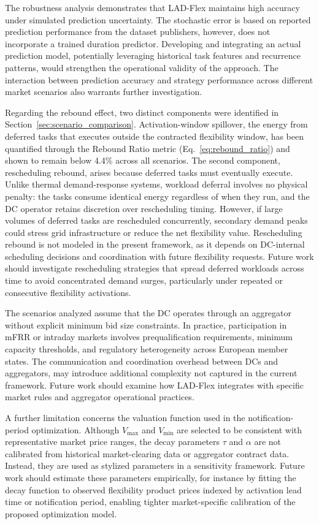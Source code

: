 \documentclass[preprint,12pt]{elsarticle}
\begin{document}
The robustness analysis demonstrates that LAD-Flex maintains high accuracy under simulated prediction uncertainty. The stochastic error is based on reported prediction performance from the dataset publishers, however, does not incorporate a trained duration predictor. Developing and integrating an actual prediction model, potentially leveraging historical task features and recurrence patterns, would strengthen the operational validity of the approach. The interaction between prediction accuracy and strategy performance across different market scenarios also warrants further investigation.

Regarding the rebound effect, two distinct components were identified in Section~\ref{sec:scenario_comparison}. Activation-window spillover, the energy from deferred tasks that executes outside the contracted flexibility window, has been quantified through the Rebound Ratio metric (Eq.~\ref{eq:rebound_ratio}) and shown to remain below 4.4\% across all scenarios. The second component, rescheduling rebound, arises because deferred tasks must eventually execute. Unlike thermal demand-response systems, workload deferral involves no physical penalty: the tasks consume identical energy regardless of when they run, and the DC operator retains discretion over rescheduling timing. However, if large volumes of deferred tasks are rescheduled concurrently, secondary demand peaks could stress grid infrastructure or reduce the net flexibility value. Rescheduling rebound is not modeled in the present framework, as it depends on DC-internal scheduling decisions and coordination with future flexibility requests. Future work should investigate rescheduling strategies that spread deferred workloads across time to avoid concentrated demand surges, particularly under repeated or consecutive flexibility activations.

The scenarios analyzed assume that the DC operates through an aggregator without explicit minimum bid size constraints. In practice, participation in mFRR or intraday markets involves prequalification requirements, minimum capacity thresholds, and regulatory heterogeneity across European member states. The communication and coordination overhead between DCs and aggregators, may introduce additional complexity not captured in the current framework. Future work should examine how LAD-Flex integrates with specific market rules and aggregator operational practices.

A further limitation concerns the valuation function used in the notification-period optimization. Although $V_{\max}$ and $V_{\min}$ are selected to be consistent with representative market price ranges, the decay parameters $\tau$ and $\alpha$ are not calibrated from historical market-clearing data or aggregator contract data. Instead, they are used as stylized parameters in a sensitivity framework. Future work should estimate these parameters empirically, for instance by fitting the decay function to observed flexibility product prices indexed by activation lead time or notification period, enabling tighter market-specific calibration of the proposed optimization model.
\end{document}
